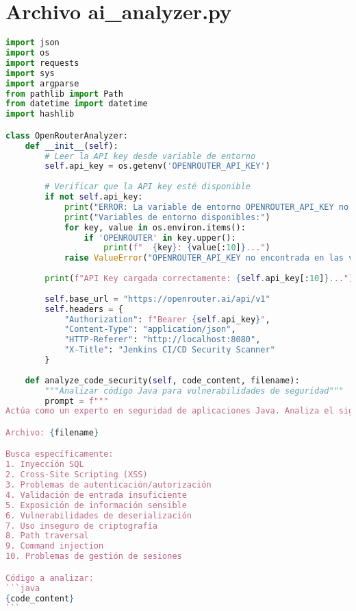 \chapter{Archivo ai\_analyzer.py}
\label{anexo:ai_analyzer}
\begin{lstlisting}[language=python, caption={Contenido completo del script ai\_analyzer.py.}, label={lst:python_script}]
import json
import os
import requests
import sys
import argparse
from pathlib import Path
from datetime import datetime
import hashlib

class OpenRouterAnalyzer:
    def __init__(self):
        # Leer la API key desde variable de entorno
        self.api_key = os.getenv('OPENROUTER_API_KEY')
        
        # Verificar que la API key esté disponible
        if not self.api_key:
            print("ERROR: La variable de entorno OPENROUTER_API_KEY no está configurada.")
            print("Variables de entorno disponibles:")
            for key, value in os.environ.items():
                if 'OPENROUTER' in key.upper():
                    print(f"  {key}: {value[:10]}...")
            raise ValueError("OPENROUTER_API_KEY no encontrada en las variables de entorno")
        
        print(f"API Key cargada correctamente: {self.api_key[:10]}...")
        
        self.base_url = "https://openrouter.ai/api/v1"
        self.headers = {
            "Authorization": f"Bearer {self.api_key}",
            "Content-Type": "application/json",
            "HTTP-Referer": "http://localhost:8080",
            "X-Title": "Jenkins CI/CD Security Scanner"
        }
        
    def analyze_code_security(self, code_content, filename):
        """Analizar código Java para vulnerabilidades de seguridad"""
        prompt = f"""
Actúa como un experto en seguridad de aplicaciones Java. Analiza el siguiente código fuente para identificar vulnerabilidades de seguridad:

Archivo: {filename}

Busca específicamente:
1. Inyección SQL
2. Cross-Site Scripting (XSS)
3. Problemas de autenticación/autorización
4. Validación de entrada insuficiente
5. Exposición de información sensible
6. Vulnerabilidades de deserialización
7. Uso inseguro de criptografía
8. Path traversal
9. Command injection
10. Problemas de gestión de sesiones

Código a analizar:
```java
{code_content}
```


\end{lstlisting}
